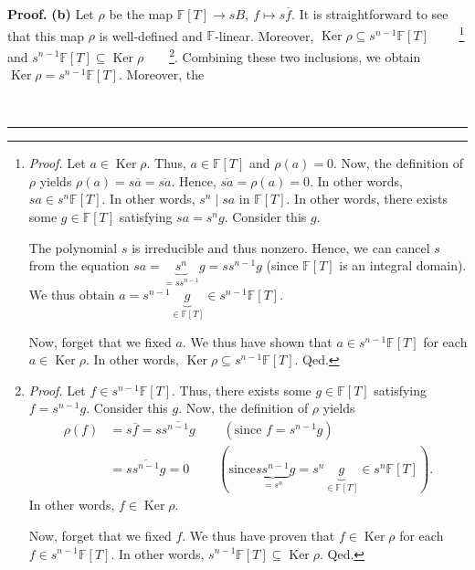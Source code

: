 \documentclass[numbers=enddot,12pt,final,onecolumn,notitlepage]{scrartcl}%
\theoremstyle{definition}
\newenvironment{proof}[1][Proof]{\noindent\textbf{#1.} }{\ \rule{0.5em}{0.5em}}
\begin{document}
\begin{proof}
\textbf{(b)} Let $\rho$ be the map $\mathbb{F}\left[  T\right]  \rightarrow
sB,\ f\mapsto s\overline{f}$. It is straightforward to see that this map
$\rho$ is well-defined and $\mathbb{F}$-linear. Moreover, $\operatorname*{Ker}%
\rho\subseteq s^{n-1}\mathbb{F}\left[  T\right]  $%
\ \ \ \ \footnote{\textit{Proof.} Let $a\in\operatorname*{Ker}\rho$. Thus,
$a\in\mathbb{F}\left[  T\right]  $ and $\rho\left(  a\right)  =0$. Now, the
definition of $\rho$ yields $\rho\left(  a\right)  =s\overline{a}%
=\overline{sa}$. Hence, $\overline{sa}=\rho\left(  a\right)  =0$. In other
words, $sa\in s^{n}\mathbb{F}\left[  T\right]  $. In other words, $s^{n}\mid
sa$ in $\mathbb{F}\left[  T\right]  $. In other words, there exists some
$g\in\mathbb{F}\left[  T\right]  $ satisfying $sa=s^{n}g$. Consider this $g$.
\par
The polynomial $s$ is irreducible and thus nonzero. Hence, we can cancel $s$
from the equation $sa=\underbrace{s^{n}}_{=ss^{n-1}}g=ss^{n-1}g$ (since
$\mathbb{F}\left[  T\right]  $ is an integral domain). We thus obtain
$a=s^{n-1}\underbrace{g}_{\in\mathbb{F}\left[  T\right]  }\in s^{n-1}%
\mathbb{F}\left[  T\right]  $.
\par
Now, forget that we fixed $a$. We thus have shown that $a\in s^{n-1}%
\mathbb{F}\left[  T\right]  $ for each $a\in\operatorname*{Ker}\rho$. In other
words, $\operatorname*{Ker}\rho\subseteq s^{n-1}\mathbb{F}\left[  T\right]  $.
Qed.} and $s^{n-1}\mathbb{F}\left[  T\right]  \subseteq\operatorname*{Ker}%
\rho$\ \ \ \ \footnote{\textit{Proof.} Let $f\in s^{n-1}\mathbb{F}\left[
T\right]  $. Thus, there exists some $g\in\mathbb{F}\left[  T\right]  $
satisfying $f=s^{n-1}g$. Consider this $g$. Now, the definition of $\rho$
yields
\begin{align*}
\rho\left(  f\right)   &  =s\overline{f}=s\overline{s^{n-1}g}%
\ \ \ \ \ \ \ \ \ \ \left(  \text{since }f=s^{n-1}g\right) \\
&  =\overline{ss^{n-1}g}=0\ \ \ \ \ \ \ \ \ \ \left(  \text{since
}\underbrace{ss^{n-1}}_{=s^{n}}g=s^{n}\underbrace{g}_{\in\mathbb{F}\left[
T\right]  }\in s^{n}\mathbb{F}\left[  T\right]  \right)  .
\end{align*}
In other words, $f\in\operatorname*{Ker}\rho$.
\par
Now, forget that we fixed $f$. We thus have proven that $f\in
\operatorname*{Ker}\rho$ for each $f\in s^{n-1}\mathbb{F}\left[  T\right]  $.
In other words, $s^{n-1}\mathbb{F}\left[  T\right]  \subseteq
\operatorname*{Ker}\rho$. Qed.}. Combining these two inclusions, we obtain
$\operatorname*{Ker}\rho=s^{n-1}\mathbb{F}\left[  T\right]  $. Moreover, the

\end{proof}
\end{document}
